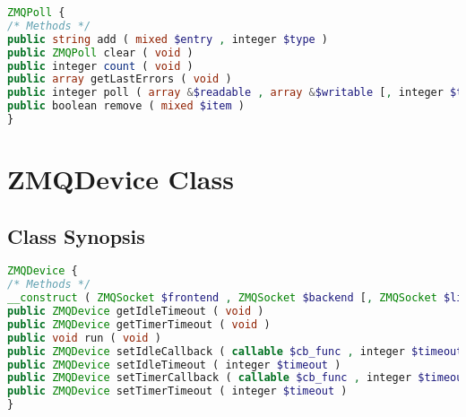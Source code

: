 \begin{lstlisting}[language=PHP]
ZMQPoll {
/* Methods */
public string add ( mixed $entry , integer $type )
public ZMQPoll clear ( void )
public integer count ( void )
public array getLastErrors ( void )
public integer poll ( array &$readable , array &$writable [, integer $timeout = -1 ] )
public boolean remove ( mixed $item )
}
\end{lstlisting}

\chapter{ZMQDevice Class}

\section{Class Synopsis}


\begin{lstlisting}[language=PHP]
ZMQDevice {
/* Methods */
__construct ( ZMQSocket $frontend , ZMQSocket $backend [, ZMQSocket $listener ] )
public ZMQDevice getIdleTimeout ( void )
public ZMQDevice getTimerTimeout ( void )
public void run ( void )
public ZMQDevice setIdleCallback ( callable $cb_func , integer $timeout [, mixed $user_data ] )
public ZMQDevice setIdleTimeout ( integer $timeout )
public ZMQDevice setTimerCallback ( callable $cb_func , integer $timeout [, mixed $user_data ] )
public ZMQDevice setTimerTimeout ( integer $timeout )
}
\end{lstlisting}